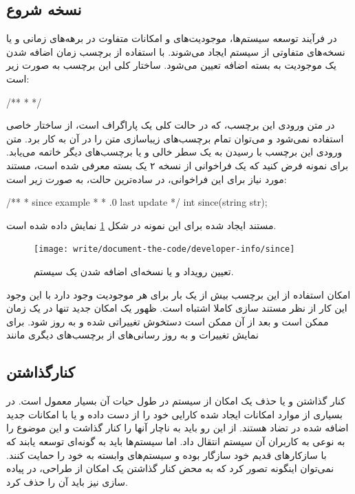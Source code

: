 \subsection{نسخه شروع}

در فرآیند توسعه سیستم‌ها، موجودیت‌های و امکانات متفاوت در برهه‌های زمانی و یا
نسخه‌های متفاوتی از سیستم ایجاد می‌شوند.
با استفاده از برچسب  زمان اضافه شدن یک موجودیت به بسته اضافه تعیین می‌شود.
ساختار کلی این برچسب به صورت زیر است:
\begin{C++}
/**
 * 
 */
\end{C++}

در متن ورودی این برچسب، که در حالت کلی یک پاراگراف است، از ساختار خاصی استفاده نمی‌شود
و می‌توان تمام برچسب‌های زیباسازی متن را در آن به کار برد.
متن ورودی این برچسب با رسیدن به یک سطر خالی و یا برچسب‌های دیگر خاتمه می‌یابد.
برای نمونه فرض کنید که یک فراخوانی از نسخه ۲ یک بسته معرفی شده است، مستند مورد نیاز برای 
این فراخوانی، در ساده‌ترین حالت، به صورت زیر است:
\begin{C++}
/**
 * \brief since example
 *
 * .0 last update
 */
int since(string str);
\end{C++}

مستند ایجاد شده برای این نمونه در شکل \ref{write/document-the-code/developer-info/since} نمایش 
داده شده است.
\begin{figure}
	\centering
	\texttt{[image: write/document-the-code/developer-info/since]}
	\caption[فهرست نویسندگان]{
		تعیین رویداد و یا نسخه‌ای اضافه شدن یک سیستم.
	}
	\label{write/document-the-code/developer-info/since}
\end{figure}

\begin{warning}
امکان استفاده از این برچسب بیش از یک بار برای هر موجودیت وجود دارد با این وجود این کار
از نظر مستند سازی کاملا اشتباه است.
ظهور یک امکان جدید تنها در یک زمان ممکن است و بعد از آن ممکن است دستخوش تغییراتی شده
و به روز شود.
برای نمایش تغییرات و به روز رسانی‌های از برچسب‌های دیگری مانند 
\end{warning}

\subsection{کنارگذاشتن}

کنار گذاشتن و یا حذف یک امکان از سیستم در طول حیات آن بسیار معمول است.
در بسیاری از موارد امکانات ایجاد شده کارایی خود را از دست داده و یا با امکانات
جدید اضافه شده در تضاد هستند.
از این رو باید به ناچار آنها را کنار گذاشت و این موضوع را به نوعی به کاربران آن
سیستم انتقال داد.
اما سیستم‌ها باید به گونه‌ای توسعه یابند که با سازکارهای قدیم خود سازگار بوده و
سیستم‌های وابسته به خود را حمایت کنند.
نمی‌توان اینگونه تصور کرد که به محض کنار گذاشتن یک امکان از طراحی، در پیاده سازی
نیز باید آن را حذف کرد.


